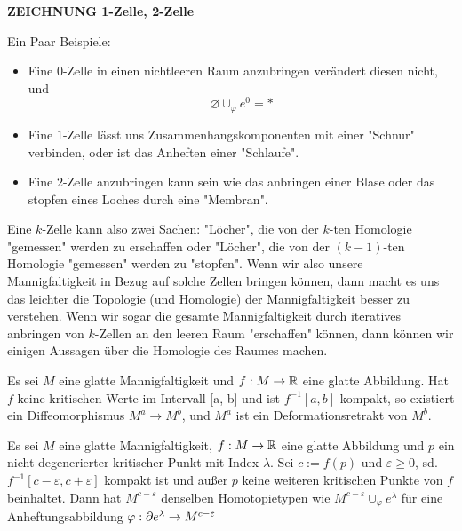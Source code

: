 \documentclass[a4paper,11pt]{article}
\begin{document}
\textbf{ZEICHNUNG 1-Zelle, 2-Zelle}

Ein Paar Beispiele: 
\begin{itemize}
    \item Eine $0$-Zelle in einen nichtleeren Raum anzubringen 
        verändert diesen nicht, und
        \[\varnothing \cup_{\varphi} e^0 = \ast\]
    \item Eine $1$-Zelle lässt uns Zusammenhangskomponenten mit einer "Schnur"
            verbinden, oder ist das Anheften einer "Schlaufe".
    \item Eine $2$-Zelle anzubringen kann sein wie das anbringen einer Blase oder
        das stopfen eines Loches durch eine "Membran".
\end{itemize}

Eine $k$-Zelle kann also zwei Sachen: "Löcher", die von der $k$-ten Homologie
"gemessen" werden zu erschaffen oder "Löcher", die von der $(k-1)$-ten Homologie
"gemessen" werden zu "stopfen". Wenn wir also unsere Mannigfaltigkeit in 
Bezug auf solche Zellen bringen können, dann macht es uns das leichter die 
Topologie (und Homologie) der Mannigfaltigkeit besser zu verstehen. Wenn wir
sogar die gesamte Mannigfaltigkeit durch iteratives anbringen von $k$-Zellen
an den leeren Raum "erschaffen" können, dann können wir einigen Aussagen über 
die Homologie des Raumes machen. 


\begin{theorem}
    \label{theorem:erstes deformationslemma}
    Es sei $M$ eine glatte Mannigfaltigkeit und $f: M \rightarrow { \mathbb R }$ eine
    glatte Abbildung. Hat $f$ keine kritischen Werte im Intervall [a, b] und ist
    $f^{-1}[a, b]$ kompakt, so existiert ein Diffeomorphismus 
    $M^a \rightarrow M^b$, und $M^a$ ist ein Deformationsretrakt von $M^b$.
\end{theorem}

\begin{theorem}
    \label{theorem:zweites deformations-lemma}
    Es sei $M$ eine glatte Mannigfaltigkeit, $f: M \rightarrow { \mathbb R }$ eine glatte
    Abbildung und $p$ ein nicht-degenerierter kritischer Punkt mit Index 
    $\lambda$. Sei $c := f(p)$ und $\varepsilon \geq 0$, sd. 
    $f^{-1}[c - \varepsilon, c + \varepsilon]$ kompakt ist und außer $p$ keine 
    weiteren kritischen Punkte von $f$ beinhaltet. Dann hat $M^{c-\varepsilon}$
    denselben Homotopietypen wie $M^{c - \varepsilon} \cup_{\varphi} e^{\lambda}$
    für eine Anheftungsabbildung 
    $\varphi: { \partial } e^{\lambda} \rightarrow M^{c-\varepsilon}$
\end{theorem}
\end{document}
